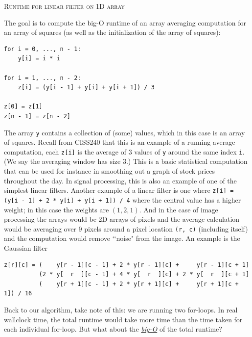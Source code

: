 

\LATEXHELPTHREEFIVEZERO

\TURNPAGE

\newpage
\textsc{Runtime for linear filter on 1D array }

The goal is to compute the big-O runtime of an array averaging computation
for an array of squares (as well as the initialization of the array of
squares):
\begin{Verbatim}[frame=single,fontsize=\small]
for i = 0, ..., n - 1:
    y[i] = i * i

for i = 1, ..., n - 2:
    z[i] = (y[i - 1] + y[i] + y[i + 1]) / 3

z[0] = z[1]
z[n - 1] = z[n - 2]
\end{Verbatim}
The array \verb!y! contains a collection of (some) values, which in this
case is an array of squares.
Recall from CISS240 that this is an example of a running average computation,
each \verb!z[i]! is the average of 3 values of \verb!y! around the
same index \verb!i!.
(We say the averaging window has size 3.)
This is a basic statistical computation that can be used for instance in
smoothing out a graph of stock prices throughout the day.
In signal processing, this is also an example of one of the simplest
linear filters.
Another example of a linear filter is one where
\verb!z[i] = (y[i - 1] + 2 * y[i] + y[i + 1]) / 4!
where the central value has a higher weight;
in this case the weights are $(1, 2, 1)$.
And in the case of image processing the arrays would be
2D arrays of pixels and the average calculation would be averaging over
9 pixels around a pixel location \verb!(r, c)! (including itself)
and the computation would remove \lq\lq noise" from the image.
An example is the Gaussian filter
\begin{Verbatim}[fontsize=\small]
z[r][c] = (    y[r - 1][c - 1] + 2 * y[r - 1][c] +     y[r - 1][c + 1]
          (2 * y[  r  ][c - 1] + 4 * y[  r  ][c] + 2 * y[  r  ][c + 1]
          (    y[r + 1][c - 1] + 2 * y[r + 1][c] +     y[r + 1][c + 1]) / 16
\end{Verbatim}

Back to our algorithm,
take note of this: we are running two for-loops.
In real wallclock time, the total runtime would take more time than the time
taken for each individual for-loop.
But what about the \underline{\textit{big-O}} of the total runtime?


